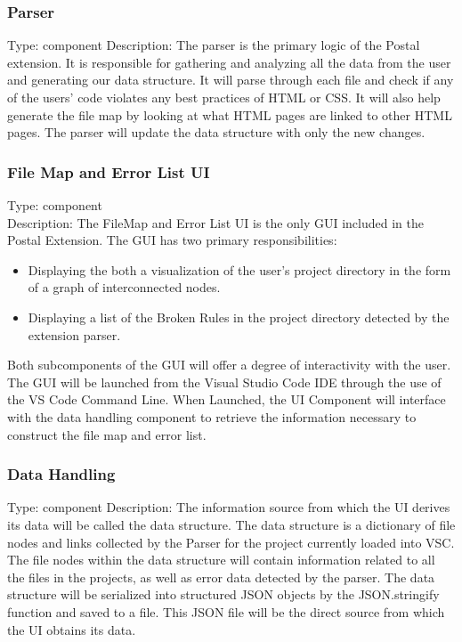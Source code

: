 \documentclass[letterpaper,10pt,titlepage,draftclsnofoot,onecolumn,onesided] {IEEEtran}
\begin{document}
	\subsubsection{Parser}
	Type: component
	Description: The parser is the primary logic of the Postal extension. 
	It is responsible for gathering and analyzing all the data from the user and generating our data structure.
	It will parse through each file and check if any of the users' code violates any best practices of HTML or CSS. 
	It will also help generate the file map by looking at what HTML pages are linked to other HTML pages.
	The parser will update the data structure with only the new changes.
	
		
	
	\subsubsection{File Map and Error List UI}
	Type: component
	\\
	Description: The FileMap and Error List UI is the only GUI included in the Postal Extension. 
	The GUI has two primary responsibilities: 
	\begin{itemize}
	\item Displaying the both a visualization of the user's project directory in the form of a graph of interconnected nodes.
	\item Displaying a list of the Broken Rules in the project directory detected by the extension parser.
	\end{itemize}
	Both subcomponents of the GUI will offer a degree of interactivity with the user. 
	The GUI will be launched from the Visual Studio Code IDE through the use of the VS Code Command Line.
	When Launched, the UI Component will interface with the data handling component to retrieve the information necessary to construct the file map and error list.

	
	\subsubsection{Data Handling} 
	Type: component
	Description: The information source from which the UI derives its data will be called the data structure. 
	The data structure is a dictionary of file nodes and links collected by the Parser for the project currently loaded into VSC. 
	The file nodes within the data structure will contain information related to all the files in the projects, as well as error data detected by the parser.
	The data structure will be serialized into structured JSON objects by the JSON.stringify function and saved to a file. \cite{stringify}
	This JSON file will be the direct source from which the UI obtains its data.
\end{document}
